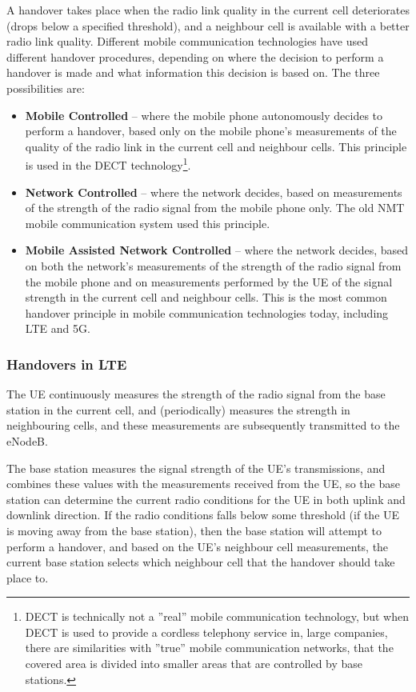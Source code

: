 A handover takes place when the radio link quality in the current cell deteriorates (\eg drops below a specified threshold), and a neighbour cell is available with a better radio link quality. Different mobile communication technologies have used different handover procedures, depending on where the decision to perform a handover is made and what information this decision is based on. The three possibilities are:

\begin{itemize}
%
\item\textbf{Mobile Controlled} -- where the mobile phone autonomously decides to perform a handover, based only on the mobile phone's measurements of the quality of the radio link in the current cell and neighbour cells. This principle is used in the DECT technology\footnote{DECT is technically not a ''real'' mobile communication technology, but when DECT is used to provide a cordless telephony service in, \eg large companies, there are similarities with ''true'' mobile communication networks, \eg that the covered area is divided into smaller areas that are controlled by base stations.}.
%
\item\textbf{Network Controlled} -- where the network decides, based on measurements of the strength of the radio signal from the mobile phone only. The old NMT mobile communication system used this principle.
%
\item\textbf{Mobile Assisted Network Controlled} -- where the network decides, based on both the network's measurements of the strength of the radio signal from the mobile phone and on measurements performed by the UE of the signal strength in the current cell and neighbour cells. This is the most common handover principle in mobile communication technologies today, including LTE and 5G.
%
\end{itemize}

\subsubsection{Handovers in LTE}
The UE continuously measures the strength of the radio signal from the base station in the current cell, and (periodically) measures the strength in neighbouring cells, and these measurements are subsequently transmitted to the eNodeB.

The base station measures the signal strength of the UE's transmissions, and combines these values with the measurements received from the UE, so the base station can determine the current radio conditions for the UE in both uplink and downlink direction. If the radio conditions falls below some threshold (\eg if the UE is moving away from the base station), then the base station will attempt to perform a handover, and based on the UE's neighbour cell measurements, the current base station selects which neighbour cell that the handover should take place to.

